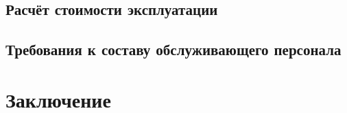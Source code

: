 \documentclass[a4paper,14pt,russian]{article}
\begin{document}
\subsection{Расчёт стоимости эксплуатации}


\subsection{Требования к составу обслуживающего персонала}


\section*{Заключение}

\renewcommand\refname{Список использованных источников}
\nocite{*}


\end{document}
